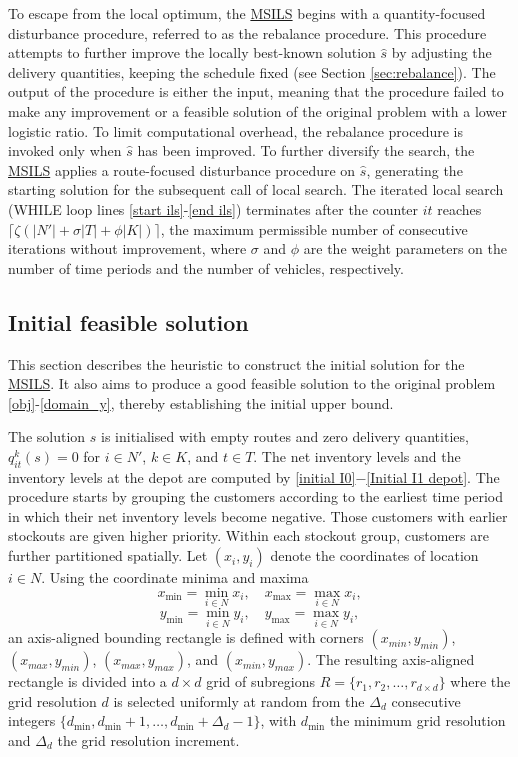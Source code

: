 \documentclass{article}
\begin{document}
To escape from the local optimum, the \hyperref[alg:MSILS]{MSILS} begins with a quantity-focused disturbance procedure, referred to as the rebalance procedure. This procedure attempts to further improve the locally best-known solution $\hat{s}$ by adjusting the delivery quantities, keeping the schedule fixed (see Section \ref{sec:rebalance}). The output of the procedure is either the input, meaning that the procedure failed to make any improvement or a feasible solution of the original problem with a lower logistic ratio. To limit computational overhead, the rebalance procedure is invoked only when $\hat{s}$ has been improved. To further diversify the search, the \hyperref[alg:MSILS]{MSILS} applies a route-focused disturbance procedure on $\hat{s}$, generating the starting solution for the subsequent call of local search. The iterated local search (WHILE loop lines \ref{start ils}-\ref{end ils}) terminates after the counter $it$ reaches $\lceil \zeta(|N'|+\sigma|T|+\phi|K|)\rceil$, the maximum permissible number of consecutive iterations without improvement, where $\sigma$ and $\phi$ are the weight parameters on the number of time periods and the number of vehicles, respectively. 



\subsection{Initial feasible solution} \label{sec:initial procedure}

This section describes the heuristic to construct the initial solution for the \hyperref[alg:MSILS]{MSILS}. It also aims to produce a good feasible solution to the original problem \eqref{obj}-\eqref{domain_y}, thereby establishing the initial upper bound. 

The solution $s$ is initialised with empty routes and zero delivery quantities, $q^k_{it}(s)=0$ for $i\in N'$, $k\in K$, and $t\in T$. The net inventory levels and the inventory levels at the depot are computed by \eqref{initial I0}$-$\eqref{Initial I1 depot}. The procedure starts by grouping the customers according to the earliest time period in which their net inventory levels become negative. Those customers with earlier stockouts are given higher priority. Within each stockout group, customers are further partitioned spatially. Let $(x_i, y_i)$ denote the coordinates of location $i \in N$. Using the coordinate minima and maxima
$$x_{\min} = \min_{i\in N} x_i,\quad x_{\max} = \max_{i\in N} x_i,$$
$$y_{\min}= \min_{i\in N} y_i,\quad y_{\max}= \max_{i\in N} y_i,$$
an axis-aligned bounding rectangle is defined with corners $(x_{min},y_{min})$, $(x_{max},y_{min})$, $(x_{max},y_{max})$, and $(x_{min},y_{max})$. The resulting axis-aligned rectangle is divided into a $d\times d$ grid of subregions $R=\{r_1,r_2,\dots,r_{d\times d}\}$ where the grid resolution $d$ is selected uniformly at random from the $\Delta_d$ consecutive integers $\{d_{\min}, d_{\min}+1, \dots, d_{\min}+\Delta_d-1\}$, with $d_{\min}$ the minimum grid resolution and $\Delta_d$ the grid resolution increment.
\end{document}

